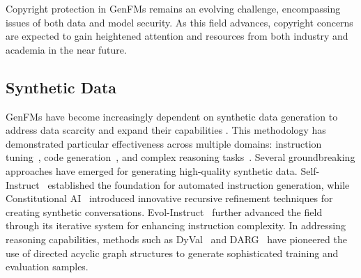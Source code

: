 Copyright protection in GenFMs remains an evolving challenge, encompassing issues of both data and model security. As this field advances, copyright concerns are expected to gain heightened attention and resources from both industry and academia in the near future.

\subsection{Synthetic Data}
GenFMs have become increasingly dependent on synthetic data generation to address data scarcity and expand their capabilities \cite{tan2024large}. This methodology has demonstrated particular effectiveness across multiple domains: instruction tuning~\cite{wang-etal-2023-self-instruct, xu2023wizardlm, li2023reflectiontuning,li2024synthetic, du2023makes,li-etal-2024-selective,li2024mosaic}, code generation~\cite{gunasekar2023textbooks, wei2023magicoder}, and complex reasoning tasks~\cite{yue2024mammoth, zhu2023dyval, yu2023metamath, lei2023s3eval, zhang2024darg}. Several groundbreaking approaches have emerged for generating high-quality synthetic data. Self-Instruct~\citep{wang-etal-2023-self-instruct} established the foundation for automated instruction generation, while Constitutional AI~\cite{bai2022constitutional} introduced innovative recursive refinement techniques for creating synthetic conversations. Evol-Instruct~\cite{xu2023wizardlm} further advanced the field through its iterative system for enhancing instruction complexity. In addressing reasoning capabilities, methods such as DyVal~\cite{zhu2023dyval} and DARG~\cite{zhang2024darg} have pioneered the use of directed acyclic graph structures to generate sophisticated training and evaluation samples.

